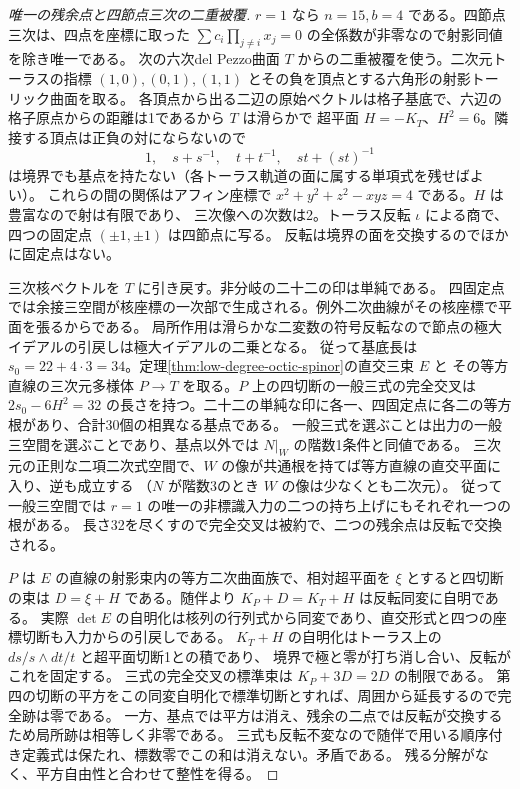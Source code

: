 \begin{proof}[唯一の残余点と四節点三次の二重被覆]
$r=1$ なら $n=15,b=4$ である。四節点三次は、四点を座標に取った
$\sum c_i\prod_{j\ne i}x_j=0$ の全係数が非零なので射影同値を除き唯一である。
次の六次del Pezzo曲面 $T$ からの二重被覆を使う。二次元トーラスの指標
$(1,0),(0,1),(1,1)$ とその負を頂点とする六角形の射影トーリック曲面を取る。
各頂点から出る二辺の原始ベクトルは格子基底で、六辺の格子原点からの距離は1であるから $T$ は滑らかで
超平面 $H=-K_T$、$H^2=6$。隣接する頂点は正負の対にならないので
\[
              1,\quad s+s^{-1},\quad t+t^{-1},\quad st+(st)^{-1}
\]
は境界でも基点を持たない（各トーラス軌道の面に属する単項式を残せばよい）。
これらの間の関係はアフィン座標で $x^2+y^2+z^2-xyz=4$ である。$H$ は豊富なので射は有限であり、
三次像への次数は2。トーラス反転 $\iota$ による商で、四つの固定点 $(\pm1,\pm1)$ は四節点に写る。
反転は境界の面を交換するのでほかに固定点はない。

三次核ベクトルを $T$ に引き戻す。非分岐の二十二の印は単純である。
四固定点では余接三空間が核座標の一次部で生成される。例外二次曲線がその核座標で平面を張るからである。
局所作用は滑らかな二変数の符号反転なので節点の極大イデアルの引戻しは極大イデアルの二乗となる。
従って基底長は $s_0=22+4\cdot3=34$。定理\ref{thm:low-degree-octic-spinor}の直交三束 $E$ と
その等方直線の三次元多様体 $P\to T$ を取る。$P$ 上の四切断の一般三式の完全交叉は
$2s_0-6H^2=32$ の長さを持つ。二十二の単純な印に各一、四固定点に各二の等方根があり、合計30個の相異なる基点である。
一般三式を選ぶことは出力の一般三空間を選ぶことであり、基点以外では $N|_W$ の階数1条件と同値である。
三次元の正則な二項二次式空間で、$W$ の像が共通根を持てば等方直線の直交平面に入り、逆も成立する
（$N$ が階数3のとき $W$ の像は少なくとも二次元）。
従って一般三空間では $r=1$ の唯一の非標識入力の二つの持ち上げにもそれぞれ一つの根がある。
長さ32を尽くすので完全交叉は被約で、二つの残余点は反転で交換される。

$P$ は $E$ の直線の射影束内の等方二次曲面族で、相対超平面を $\xi$ とすると四切断の束は
$D=\xi+H$ である。随伴より $K_P+D=K_T+H$ は反転同変に自明である。
実際 $\det E$ の自明化は核列の行列式から同変であり、直交形式と四つの座標切断も入力からの引戻しである。
$K_T+H$ の自明化はトーラス上の $ds/s\wedge dt/t$ と超平面切断1との積であり、
境界で極と零が打ち消し合い、反転がこれを固定する。
三式の完全交叉の標準束は $K_P+3D=2D$ の制限である。
第四の切断の平方をこの同変自明化で標準切断とすれば、周囲から延長するので完全跡は零である。
一方、基点では平方は消え、残余の二点では反転が交換するため局所跡は相等しく非零である。
三式も反転不変なので随伴で用いる順序付き定義式は保たれ、標数零でこの和は消えない。矛盾である。
残る分解がなく、平方自由性と合わせて整性を得る。
\end{proof}
